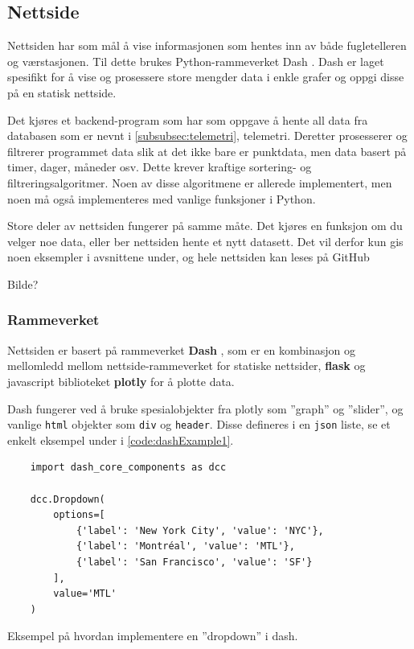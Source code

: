 

\subsection{Nettside}


Nettsiden har som mål å vise informasjonen som hentes inn av både fugletelleren og værstasjonen. Til dette brukes Python-rammeverket Dash \cite{dash}. Dash er laget spesifikt for å vise og prosessere store mengder data i enkle grafer og oppgi disse på en statisk nettside. 

Det kjøres et backend-program som har som oppgave å hente all data fra databasen som er nevnt i \autoref{subsubsec:telemetri}, telemetri. Deretter prosesserer og filtrerer programmet data slik at det ikke bare er punktdata, men data basert på timer, dager, måneder osv. Dette krever kraftige sortering- og filtreringsalgoritmer. Noen av disse algoritmene er allerede implementert, men noen må også implementeres med vanlige funksjoner i Python. 

Store deler av nettsiden fungerer på samme måte. Det kjøres en funksjon om du velger noe data, eller ber nettsiden hente et nytt datasett. Det vil derfor kun gis noen eksempler i avsnittene under, og hele nettsiden kan leses på GitHub

Bilde?

\subsubsection{Rammeverket}

Nettsiden er basert på rammeverket \textbf{Dash} \cite{dash}, som er en kombinasjon og mellomledd mellom nettside-rammeverket for statiske nettsider, \textbf{flask} \cite{flask} og javascript biblioteket \textbf{plotly} \cite{plotly} for å plotte data.

Dash fungerer ved å bruke spesialobjekter fra plotly som ''graph'' og ''slider'', og vanlige \texttt{html} objekter som \texttt{div} og \texttt{header}. Disse defineres i en \texttt{json} liste, se et enkelt eksempel under i \autoref{code:dashExample1}. 

\begin{code}
\begin{verbatim}
    import dash_core_components as dcc

    dcc.Dropdown(
        options=[
            {'label': 'New York City', 'value': 'NYC'},
            {'label': 'Montréal', 'value': 'MTL'},
            {'label': 'San Francisco', 'value': 'SF'}
        ],
        value='MTL'
    )
\end{verbatim}
\caption{Eksempel på hvordan implementere en ''dropdown'' i dash.}
\label{code:dashExample1}
\end{code}

